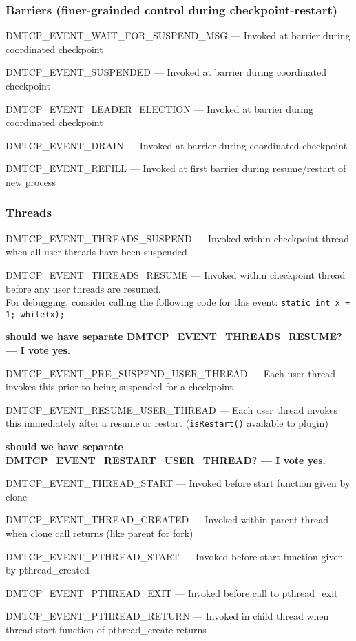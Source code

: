 \documentclass{article}
\begin{document}
\subsubsection*{Barriers (finer-grainded control during checkpoint-restart)}
\begin{list}{}{\leftmargin=3em \itemindent=-2em}
\item
  DMTCP\_EVENT\_WAIT\_FOR\_SUSPEND\_MSG --- Invoked at barrier during
coordinated checkpoint
\item
  DMTCP\_EVENT\_SUSPENDED --- Invoked at barrier during coordinated checkpoint
\item
  DMTCP\_EVENT\_LEADER\_ELECTION --- Invoked at barrier during coordinated checkpoint
\item
  DMTCP\_EVENT\_DRAIN --- Invoked at barrier during coordinated checkpoint
\item
  DMTCP\_EVENT\_REFILL --- Invoked at first barrier during resume/restart of new process
\end{list}

\subsubsection*{Threads}
\begin{list}{}{\leftmargin=3em \itemindent=-2em}
\item
  DMTCP\_EVENT\_THREADS\_SUSPEND --- Invoked within checkpoint thread
	when all user threads have been suspended
\item
  DMTCP\_EVENT\_THREADS\_RESUME --- Invoked within checkpoint thread before
	any user threads are resumed. \\
	For debugging, consider calling the following code for this
        event:  {\tt static int x = 1; while(x);}
\item
  {\bf should we have separate DMTCP\_EVENT\_THREADS\_RESUME?  --- I vote yes.}
\item
  DMTCP\_EVENT\_PRE\_SUSPEND\_USER\_THREAD --- Each user thread invokes this prior
	to being suspended for a checkpoint
\item
  DMTCP\_EVENT\_RESUME\_USER\_THREAD --- Each user thread invokes this immediately
	after a resume or restart ({\tt isRestart()} available to plugin)
\item
  {\bf should we have separate DMTCP\_EVENT\_RESTART\_USER\_THREAD?  --- I vote yes.}
\item
  DMTCP\_EVENT\_THREAD\_START --- Invoked before start function given by clone
\item
  DMTCP\_EVENT\_THREAD\_CREATED --- Invoked within parent thread when clone call returns  (like parent for fork)
\item
  DMTCP\_EVENT\_PTHREAD\_START --- Invoked before start function given by pthread\_created
\item
  DMTCP\_EVENT\_PTHREAD\_EXIT --- Invoked before call to pthread\_exit
\item
  DMTCP\_EVENT\_PTHREAD\_RETURN --- Invoked in child thread when thread start function of pthread\_create returns
\item
\end{list}
\end{document}
